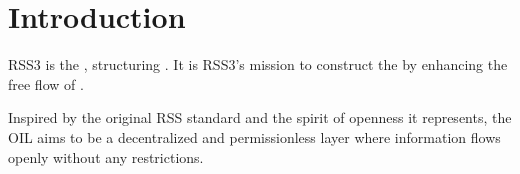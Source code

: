 \section{Introduction}

RSS3 is the , structuring . It is RSS3's mission to construct the  by enhancing the free flow of .

Inspired by the original RSS standard \cite{rssadvisoryboard2009RSS} and the spirit of openness it represents, the \gls{OIL} aims to be a decentralized and permissionless layer where information flows openly without any restrictions.

